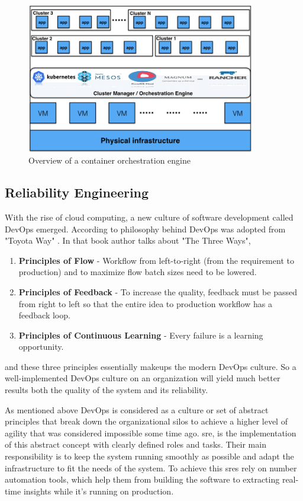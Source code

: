\begin{figure}[H]
    \includegraphics[width=10cm]{assets/literature-review/Container-orchestration-engines.png}
    \caption{Overview of a container orchestration engine \citep{ElasticityCloudComputing}}
\end{figure}


\subsection{Reliability Engineering}

With the rise of cloud computing, a new culture of software development called DevOps emerged. According to \cite{kim2014phoenix} philosophy behind DevOps was adopted from "Toyota Way"  \citep{liker2006toyota}. In that book author talks about "The Three Ways",
\begin{enumerate}
\item \textbf{Principles of Flow} - Workflow from left-to-right (from the requirement to production) and to maximize flow batch sizes need to be lowered.
\item \textbf{Principles of Feedback} - To increase the quality, feedback must be passed from right to left so that the entire idea to production workflow has a feedback loop. 
\item \textbf{Principles of Continuous Learning} - Every failure is a learning opportunity.
\end{enumerate}
and these three principles essentially makeups the modern DevOps culture. So a well-implemented DevOps culture on an organization will yield much better results both the quality of the system and its reliability. 

As mentioned above DevOps is considered as a culture or set of abstract principles that break down the organizational silos to achieve a higher level of agility that was considered impossible some time ago. \ac{sre}, is the implementation of this abstract concept with clearly defined roles and tasks. Their main responsibility is to keep the system running smoothly as possible and adapt the infrastructure to fit the needs of the system. To achieve this \acp{sre} rely on number automation tools, which help them from building the software to extracting real-time insights while it's running on production.


